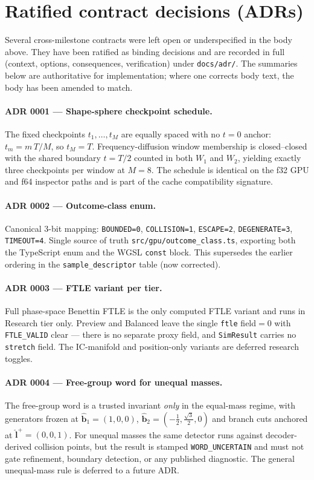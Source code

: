 \documentclass[11pt]{report}
\begin{document}
\section{Ratified contract decisions (ADRs)}
\label{sec:ratified-adrs}

Several cross-milestone contracts were left open or underspecified in the body
above. They have been ratified as binding decisions and are recorded in full
(context, options, consequences, verification) under \texttt{docs/adr/}. The
summaries below are authoritative for implementation; where one corrects body
text, the body has been amended to match.

\paragraph{ADR 0001 --- Shape-sphere checkpoint schedule.} The fixed checkpoints
$t_1,\ldots,t_M$ are equally spaced with no $t=0$ anchor: $t_m = m\,T/M$, so
$t_M = T$. Frequency-diffusion window membership is closed--closed with the
shared boundary $t=T/2$ counted in both $W_1$ and $W_2$, yielding exactly three
checkpoints per window at $M=8$. The schedule is identical on the f32 GPU and
f64 inspector paths and is part of the cache compatibility signature.

\paragraph{ADR 0002 --- Outcome-class enum.} Canonical 3-bit mapping:
\texttt{BOUNDED=0}, \texttt{COLLISION=1}, \texttt{ESCAPE=2},
\texttt{DEGENERATE=3}, \texttt{TIMEOUT=4}. Single source of truth
\texttt{src/gpu/outcome\_class.ts}, exporting both the TypeScript enum and the
WGSL \texttt{const} block. This supersedes the earlier ordering in the
\texttt{sample\_descriptor} table (now corrected).

\paragraph{ADR 0003 --- FTLE variant per tier.} Full phase-space Benettin FTLE
is the only computed FTLE variant and runs in Research tier only. Preview and
Balanced leave the single \texttt{ftle} field${}=0$ with \texttt{FTLE\_VALID}
clear --- there is no separate proxy field, and \texttt{SimResult} carries no
\texttt{stretch} field. The IC-manifold and position-only variants are deferred
research toggles.

\paragraph{ADR 0004 --- Free-group word for unequal masses.} The free-group word
is a trusted invariant \emph{only} in the equal-mass regime, with generators
frozen at $\hat{\mathbf b}_1=(1,0,0)$, $\hat{\mathbf b}_2=(-\tfrac12,\tfrac{\sqrt3}{2},0)$
and branch cuts anchored at $\hat{\mathbf l}^+=(0,0,1)$. For unequal masses the
same detector runs against decoder-derived collision points, but the result is
stamped \texttt{WORD\_UNCERTAIN} and must not gate refinement, boundary
detection, or any published diagnostic. The general unequal-mass rule is
deferred to a future ADR.
\end{document}
